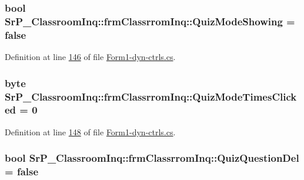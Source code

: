 \hypertarget{class_sr_p___classroom_inq_1_1frm_classrrom_inq_a2be9d2ea6cc1cabf0dc6c6f3ee2544ce}{
\subsubsection[{\-Quiz\-Mode\-Showing}]{\setlength{\rightskip}{0pt plus 5cm}bool {\bf \-Sr\-P\-\_\-\-Classroom\-Inq\-::frm\-Classrrom\-Inq\-::\-Quiz\-Mode\-Showing} = false}}
\label{class_sr_p___classroom_inq_1_1frm_classrrom_inq_a2be9d2ea6cc1cabf0dc6c6f3ee2544ce}


\-Definition at line \hyperlink{_form1-dyn-ctrls_8cs_source_l00146}{146} of file \hyperlink{_form1-dyn-ctrls_8cs_source}{\-Form1-\/dyn-\/ctrls.\-cs}.

\hypertarget{class_sr_p___classroom_inq_1_1frm_classrrom_inq_a0c88b881dc5ae86b5b3d5e04434b2ea8}{
\subsubsection[{\-Quiz\-Mode\-Times\-Clicked}]{\setlength{\rightskip}{0pt plus 5cm}byte {\bf \-Sr\-P\-\_\-\-Classroom\-Inq\-::frm\-Classrrom\-Inq\-::\-Quiz\-Mode\-Times\-Clicked} = 0}}
\label{class_sr_p___classroom_inq_1_1frm_classrrom_inq_a0c88b881dc5ae86b5b3d5e04434b2ea8}


\-Definition at line \hyperlink{_form1-dyn-ctrls_8cs_source_l00148}{148} of file \hyperlink{_form1-dyn-ctrls_8cs_source}{\-Form1-\/dyn-\/ctrls.\-cs}.

\hypertarget{class_sr_p___classroom_inq_1_1frm_classrrom_inq_aa1c6ba1dda756081aba5b3cfea87b09d}{
\subsubsection[{\-Quiz\-Question\-Del}]{\setlength{\rightskip}{0pt plus 5cm}bool {\bf \-Sr\-P\-\_\-\-Classroom\-Inq\-::frm\-Classrrom\-Inq\-::\-Quiz\-Question\-Del} = false}}
\label{class_sr_p___classroom_inq_1_1frm_classrrom_inq_aa1c6ba1dda756081aba5b3cfea87b09d}


